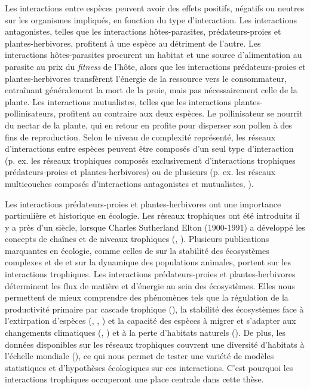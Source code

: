 Les interactions entre espèces peuvent avoir des effets positifs, négatifs ou
neutres sur les organismes impliqués, en fonction du type d'interaction. Les
interactions antagonistes, telles que les interactions hôtes-parasites,
prédateurs-proies et plantes-herbivores, profitent à une espèce au détriment de
l'autre. Les interactions hôtes-parasites procurent un habitat et une source
d'alimentation au parasite au prix du \textit{fitness} de l'hôte, alors que les
interactions prédateurs-proies et plantes-herbivores transfèrent l'énergie de la
ressource vers le consommateur, entraînant généralement la mort de la proie,
mais pas nécessairement celle de la plante. Les interactions mutualistes, telles
que les interactions plantes-pollinisateurs, profitent au contraire aux deux
espèces. Le pollinisateur se nourrit du nectar de la plante, qui en retour en
profite pour disperser son pollen à des fins de reproduction. Selon le niveau de
complexité représenté, les réseaux d'interactions entre espèces peuvent être
composés d'un seul type d'interaction (p. ex. les réseaux trophiques composés
exclusivement d'interactions trophiques prédateurs-proies et plantes-herbivores)
ou de plusieurs (p. ex. les réseaux multicouches composés d'interactions
antagonistes et mutualistes, \cite{Pilosof2017Multilayer}).

Les interactions prédateurs-proies et plantes-herbivores ont une importance
particulière et historique en écologie. Les réseaux trophiques ont été
introduits il y a près d'un siècle, lorsque Charles Sutherland Elton (1900-1991)
a développé les concepts de chaînes et de niveaux trophiques
(\cite{Elton1927Animal}, \cite{Elton1958Ecology}). Plusieurs publications
marquantes en écologie, comme celles de \cite{May1972Will} sur la stabilité des
écosystèmes complexes et de \cite{Lotka1925Elements} et
\cite{Volterra1927Fluctuations} sur la dynamique des populations animales,
portent sur les interactions trophiques. Les interactions prédateurs-proies et
plantes-herbivores déterminent les flux de matière et d'énergie au sein des
écosystèmes. Elles nous permettent de mieux comprendre des phénomènes tels que
la régulation de la productivité primaire par cascade trophique
(\cite{Carpenter1987Regulation}), la stabilité des écosystèmes face à
l'extirpation d'espèces (\cite{Dunne2002Network}, \cite{Srinivasan2007Response},
\cite{Staniczenko2010Structural}) et la capacité des espèces à migrer et
s'adapter aux changements climatiques (\cite{Tylianakis2008Global},
\cite{Gilman2010Framework}) et à la perte d'habitats naturels
(\cite{Evans2013Robustness}). De plus, les données disponibles sur les réseaux
trophiques couvrent une diversité d'habitats à l'échelle mondiale
(\cite{Poisot2021Global}), ce qui nous permet de tester une variété de modèles
statistiques et d'hypothèses écologiques sur ces interactions. C'est pourquoi
les interactions trophiques occuperont une place centrale dans cette thèse.

